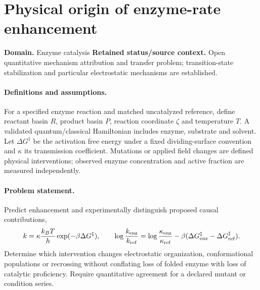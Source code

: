\documentclass[11pt]{article}
\begin{document}
\section*{Physical origin of enzyme-rate enhancement}
\label{prob:093}
\label{rank:71}
\par\smallskip

\noindent\textbf{Domain.} Enzyme catalysis \quad \textbf{Retained status/source context.} Open quantitative mechanism attribution and transfer problem; transition-state stabilization and particular electrostatic mechanisms are established.
\paragraph{Definitions and assumptions.} For a specified enzyme reaction and matched uncatalyzed reference, define reactant basin $R$, product basin $P$, reaction coordinate $\zeta$ and temperature $T$. A validated quantum/classical Hamiltonian includes enzyme, substrate and solvent. Let $\Delta G^\ddagger$ be the activation free energy under a fixed dividing-surface convention and $\kappa$ its transmission coefficient. Mutations or applied field changes are defined physical interventions; observed enzyme concentration and active fraction are measured independently.
\paragraph{Problem statement.} Predict enhancement and experimentally distinguish proposed causal contributions,
\[k=\kappa\frac{k_BT}{h}\exp(-\beta\Delta G^\ddagger),\qquad \log\frac{k_{\rm enz}}{k_{\rm ref}}=\log\frac{\kappa_{\rm enz}}{\kappa_{\rm ref}}-\beta(\Delta G^\ddagger_{\rm enz}-\Delta G^\ddagger_{\rm ref}).\]
Determine which intervention changes electrostatic organization, conformational populations or recrossing without conflating loss of folded enzyme with loss of catalytic proficiency. Require quantitative agreement for a declared mutant or condition series.
\end{document}
